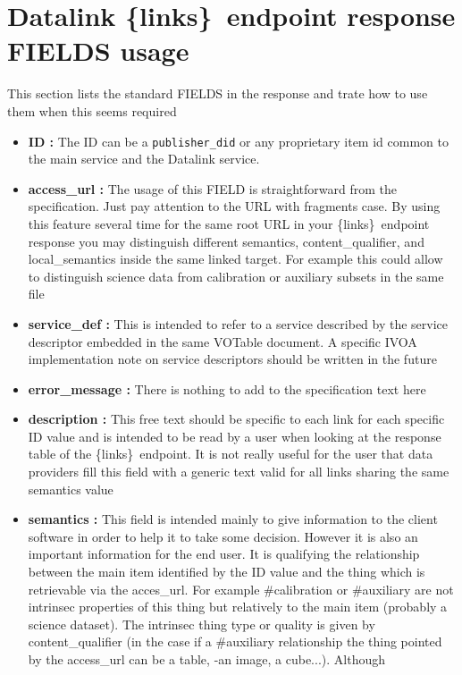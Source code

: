 \documentclass[11pt,a4paper]{ivoa}
\newcommand{\blinks}{\{links\}}
\begin{document}
\section{Datalink \blinks\ endpoint response FIELDS usage}
\label{sec:fill}
This section lists the standard FIELDS in the response and 
trate how to use them when this seems required
\begin{itemize}
\item \textbf{ID :} The ID can be a \verb|publisher_did| or any proprietary item id common to
the main service and the Datalink service.  
\item \textbf{access\_url :} The usage of this FIELD is straightforward from the 
specification. Just pay attention to the  URL with fragments case. By using this feature 
several time for the same root URL in your \blinks\ endpoint response you may distinguish
different semantics, content\_qualifier, and local\_semantics inside the same linked target.
For example this could allow to distinguish science data from calibration or auxiliary 
subsets in the same file
\item \textbf{service\_def :} This is intended to refer to a service described by the service
descriptor embedded in the same VOTable document. A specific IVOA implementation note on 
service descriptors should be written in the future
\item \textbf{error\_message :} There is nothing to add to the specification text here
\item \textbf{description :} This free text should be specific to each link for each specific 
ID value and is intended to be read by a user when looking at the response table of the 
\blinks\ endpoint. It is not really useful for the user that data providers fill this field 
with a generic text valid for all links sharing the same semantics value 
\item \textbf{semantics :} This field is intended mainly to give information to the client 
software in order to help it to take some decision. However it is also an important information
for the end user. It is qualifying the relationship between the main item identified by the ID
value and the thing which is retrievable via the acces\_url. For example \#calibration or 
\#auxiliary are not intrinsec properties of this thing but relatively to the main item 
(probably a science dataset). The intrinsec thing type or quality is given by 
content\_qualifier (in the case if a \#auxiliary relationship the thing pointed by the 
access\_url can be a table, -an image, a cube...). Although    

\end{itemize}
\end{document}
